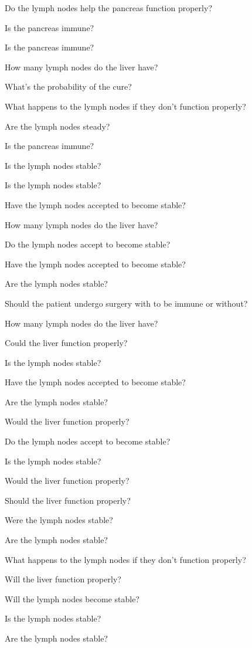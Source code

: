 \documentclass{article}
\begin{document}
Do the lymph nodes help the pancreas function properly?

Is the pancreas immune?

Is the pancreas immune?

How many lymph nodes do the liver have?

What’s the probability of the cure?

What happens to the lymph nodes if they don’t function properly?

Are the lymph nodes steady?

Is the pancreas immune?

Is the lymph nodes stable?

Is the lymph nodes stable?

Have the lymph nodes accepted to become stable?

How many lymph nodes do the liver have?

Do the lymph nodes accept to become stable?

Have the lymph nodes accepted to become stable?

Are the lymph nodes stable?

Should the patient undergo surgery with to be immune or without?

How many lymph nodes do the liver have?

Could the liver function properly?

Is the lymph nodes stable?

Have the lymph nodes accepted to become stable?

Are the lymph nodes stable?

Would the liver function properly?

Do the lymph nodes accept to become stable?

Is the lymph nodes stable?

Would the liver function properly?

Should the liver function properly?

Were the lymph nodes stable?

Are the lymph nodes stable?

What happens to the lymph nodes if they don’t function properly?

Will the liver function properly?

Will the lymph nodes become stable?

Is the lymph nodes stable?

Are the lymph nodes stable?
\end{document}

